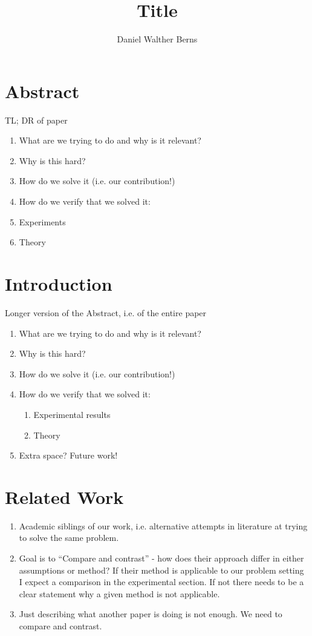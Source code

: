 \documentclass[10pt,a4paper]{article}
\author{Daniel Walther Berns}
\title{Title}
\begin{document}
	
\section{Abstract}

TL; DR of paper
 
\begin{enumerate}
	\item What are we trying to do and why is it relevant?
	\item Why is this hard?
	\item How do we solve it (i.e. our contribution!)
	\item How do we verify that we solved it:
	\item Experiments
	\item Theory
\end{enumerate}

\section{Introduction}

Longer version of the Abstract, i.e. of the entire paper



\begin{enumerate}
	\item What are we trying to do and why is it relevant?
	\item Why is this hard?
	\item How do we solve it (i.e. our contribution!)
	\item How do we verify that we solved it:
	\begin{enumerate}
		\item Experimental results
		\item Theory
	\end{enumerate}
	\item Extra space? Future work!
\end{enumerate}

\section{Related Work}    
\begin{enumerate}
	\item Academic siblings of our work, i.e. alternative attempts in literature at trying to solve the same problem.
	\item Goal is to “Compare and contrast” - how does their approach differ in either assumptions or method? If their method is applicable to our problem setting I expect a comparison in the experimental section. If not there needs to be a clear statement why a given method is not applicable.
	\item Just describing what another paper is doing is not enough. We need to compare and contrast.
\end{enumerate}
\end{document}

